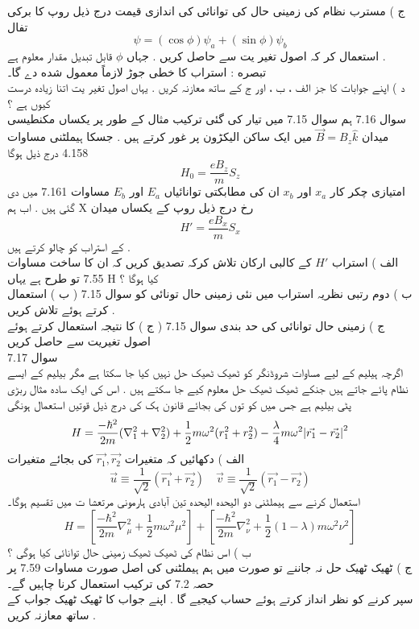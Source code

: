 ج ) مسترب نظام کی زمینی حال کی توانائی کی اندازی قیمت درج ذیل روپ کا برکی تفال
\[\psi=(\cos{\phi})\psi_{a}+(\sin{\phi})\psi_{b}\]
استعمال کر کہ اصول تغیر یت سے حاصل کریں . جہاں
\(\phi\)
قابل تبدیل مقدار معلوم ہے .\\
تبصره : استراب کا خطی جوڑ لازماً معمول شده دے گا۔\\
د ) اپنے جوابات کا جز الف ، ب ، اور ج کے ساتھ معازنہ کریں . یہاں اصول تغیر یت اتنا زیادہ درست کیوں ہے ؟\\
سوال 7.16
ہم سوال 7.15 میں تیار کی گئی ترکیب مثال کے طور پر یکساں مکنطیسی میدان
\(\vec{B}=B_{z}\hat{k}\)
میں ایک ساکن الیکڑون پر غور کرتے ہیں . جسکا ہیملٹنی مساوات 4.158 درج ذیل ہوگا
\[H_{0}=\frac{eB_{z}}{m}S_{z}\]
امتیازی چکر کار
\(x_{a}\)
اور
\(x_{b}\)
ان کی مطابکتی توانائیاں
\(E_{a}\)
اور
\(E_{b}\)
مساوات 7.161 میں دی گئی ہیں .
اب ہم X رخ درج ذیل روپ کے یکساں میدان
\[H'=\frac{eB_{x}}{m}S_{x}\]
کے استراب کو چالو کرتے ہیں .\\
الف ) استراب
\(H'\)
کے کالبی ارکان تلاش کرکہ تصدیق کریں کہ ان کا ساخت مساوات 7.55 تو طرح ہے یہاں H کیا ہوگا ؟\\
ب ) دوم رتبی نظریہ استراب میں نئی زمینی حال تونائی کو سوال 7.15 ( ب ) استعمال کرتے ہوئے تلاش کریں .\\
ج ) زمینی حال توانائی کی حد بندی سوال 7.15 ( ج ) کا نتیجہ استعمال کرتے ہوئے اصول تغیریت سے حاصل کریں\\
سوال 
7.17\\
اگرچہ ہیلیم کے لیے مساوات شروڈنگر کو ٹھیک ٹھیک حل نہیں کیا جا سکتا ہے مگر بیلیم کے ایسے نظام پائے جاتے ہیں جنکے ٹھیک ٹھیک حل معلوم کیے جا سکتے ہیں . اس کی ایک ساده مثال ربڑی پٹی بیلیم ہے جس میں کو توں کی بجائے قانون ہک کی درج ذیل قوتیں استعمال ہونگی
\[H=\frac{-\hbar^{2}}{2m}(\nabla_{1}^{2}+\nabla_{2}^{2})+\frac{1}{2}m\omega^{2}(r_{1}^{2}+r_{2}^{2})-\frac{\lambda}{4}m\omega^{2}\abs{\vec{r_{1}}-\vec{r_{2}}}^{2}\]
الف ) دکھائیں کہ متغیرات
\(\vec{r_{1}}, \vec{r_{2}}\)
کی بجائے متغیرات
\[\vec{u}\equiv\frac{1}{\sqrt{2}}(\vec{r_{1}}+\vec{r_{2}})\quad \vec{v}\equiv\frac{1}{\sqrt{2}}(\vec{r_{1}}-\vec{r_{2}})\]
استعمال کرنے سے ہیملٹنی دو الیحدہ الیحدہ تین آبادی ہارمونی مرتعشا ت میں تقسیم ہوگا۔
\[H=[\frac{-\hbar^{2}}{2m}\nabla_{\mu}^{2}+\frac{1}{2}m\omega^{2}\mu^{2}]+[\frac{-\hbar^{2}}{2m}\nabla_{\nu}^{2}+\frac{1}{2}(1-\lambda)m\omega^{2}\nu^{2}]\]
ب ) اس نظام کی ٹھیک ٹھیک زمینی حال توانائی کیا ہوگی ؟\\
ج ) ٹھیک ٹھیک حل نہ جاننے تو صورت میں ہم ہیملٹنی کی اصل صورت مساوات 7.59 پر حصہ 7.2 کی ترکیب استعمال کرنا چاہیں گے۔\\
سپر کرنے کو نظر انداز کرتے ہوئے حساب کیجیے گا . اپنے جواب کا ٹھیک ٹھیک جواب کے ساتھ معازنہ کریں .\\

